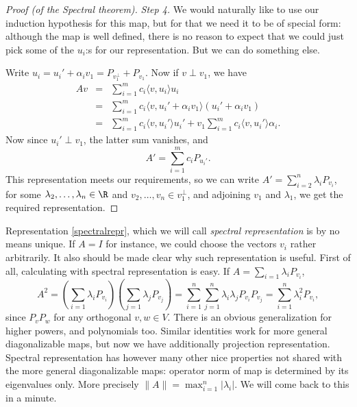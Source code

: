 \begin{proof}[Proof (of the Spectral theorem)]
	\textit{Step 4.} We would naturally like to use our induction hypothesis for this map, but for that we need it to be of special form: although the map is well defined, there is no reason to expect that we could just pick some of the $u_{i}$:s for our representation. But we can do something else.

	Write $u_{i} = u_{i}' + \alpha_{i} v_{1} = P_{v_{1}^{\perp}} + P_{v_{1}}$. Now if $v \perp v_{1}$, we have
	\begin{eqnarray*}
		A v &=& \sum_{i = 1}^{m} c_{i} \langle v, u_{i}\rangle u_{i} \\
		&=& \sum_{i = 1}^{m} c_{i} \langle v, u_{i}' + \alpha_{i} v_{1}\rangle (u_{i}' + \alpha_{i} v_{1}) \\
		&=& \sum_{i = 1}^{m} c_{i} \langle v, u_{i}'\rangle u_{i}' +  v_{1} \sum_{i = 1}^{m} c_{i} \langle v, u_{i}'\rangle \alpha_{i}.
	\end{eqnarray*}
	Now since $u_{i}' \perp v_{1}$, the latter sum vanishes, and
	\[
		A' = \sum_{i = 1}^{m} c_{i} P_{u_{i}'}.
	\]
	This representation meets our requirements, so we can write $A' = \sum_{i = 2}^{n} \lambda_{i} P_{v_{i}}$, for some $\lambda_{2}, \ldots, \lambda_{n} \in \R$ and $v_{2}, \ldots, v_{n} \in v_{1}^{\perp}$, and adjoining $v_{1}$ and $\lambda_{1}$, we get the required representation.
\end{proof}

Representation \ref{spectralrepr}, which we will call \textit{spectral representation} is by no means unique. If $A = I$ for instance, we could choose the vectors $v_{i}$ rather arbitrarily. It also should be made clear why such representation is useful. First of all, calculating with spectral representation is easy. If $A = \sum_{i = 1} \lambda_{i} P_{v_{i}}$,
\[
	A^{2} = \left(\sum_{i = 1} \lambda_{i} P_{v_{i}}\right) \left(\sum_{j = 1} \lambda_{j} P_{v_{j}}\right) = \sum_{i = 1}^{n} \sum_{j = 1}^{n}\lambda_{i} \lambda_{j} P_{v_{i}} P_{v_{j}} = \sum_{i = 1}^{n} \lambda_{i}^2 P_{v_{i}},
\]
since $P_{v}P_{w}$ for any orthogonal $v, w \in V$. There is an obvious generalization for higher powers, and polynomials too. Similar identities work for more general diagonalizable maps, but now we have additionally projection representation. Spectral representation has however many other nice properties not shared with the more general diagonalizable maps: operator norm of map is determined by its eigenvalues only. More precisely $\|A\| = \max_{i = 1}^{n} |\lambda_{i}|$. We will come back to this in a minute.

